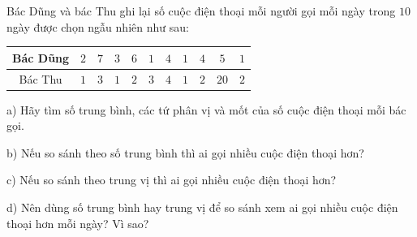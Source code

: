 \begin{ex}
Bác Dũng và bác Thu ghi lại số cuộc điện thoại mỗi người gọi mỗi ngày trong $10$ ngày được chọn ngẫu nhiên như sau:
\begin{center}
\begin{tabular}{|c|c|c|c|c|c|c|c|c|c|c|}\hline
Bác Dũng & $2$ & $7$ & $3$ & $6$ & $1$ & $4$ & $1$ & $4$ & $5$ & $1$\\\hline
Bác Thu & $1$ & $3$ & $1$ & $2$ & $3$ & $4$ & $1$ & $2$ & $20$ & $2$\\\hline
\end{tabular}
\end{center}
a) Hãy tìm số trung bình, các tứ phân vị và mốt của số cuộc điện thoại mỗi bác gọi.

b) Nếu so sánh theo số trung bình thì ai gọi nhiều cuộc điện thoại hơn?

c) Nếu so sánh theo trung vị thì ai gọi nhiều cuộc điện thoại hơn?

d) Nên dùng số trung bình hay trung vị để so sánh xem ai gọi nhiều cuộc điện thoại hơn mỗi ngày? Vì sao?
\end{ex}
